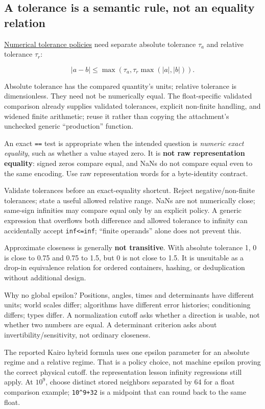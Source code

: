 \subsection{A tolerance is a semantic rule, not an equality relation}\label{01-foundations-i-ch001-a-tolerance-is-a-semantic-rule-not-an-equality-relation}

\hyperref[appendix-0ec599f8ba27]{Numerical tolerance policies} need separate absolute tolerance \(\tau_a\) and relative tolerance \(\tau_r\):

\[
|a-b|\le\max\!\left(\tau_a,\tau_r\max(|a|,|b|)\right).
\]

Absolute tolerance has the compared quantity's units; relative tolerance is dimensionless. They need not be numerically equal. The float-specific validated comparison already supplies validated tolerances, explicit non-finite handling, and widened finite arithmetic; reuse it rather than copying the attachment's unchecked generic ``production'' function.

An exact \texttt{==} test is appropriate when the intended question is \emph{numeric exact equality}, such as whether a value stayed zero. It is \textbf{not raw representation equality}: signed zeros compare equal, and NaNs do not compare equal even to the same encoding. Use raw representation words for a byte-identity contract.

Validate tolerances before an exact-equality shortcut. Reject negative/non-finite tolerances; state a useful allowed relative range. NaNs are not numerically close; same-sign infinities may compare equal only by an explicit policy. A generic expression that overflows both difference and allowed tolerance to infinity can accidentally accept \texttt{inf\textless{}=inf}; ``finite operands'' alone does not prevent this.

Approximate closeness is generally \textbf{not transitive}. With absolute tolerance 1, 0 is close to 0.75 and 0.75 to 1.5, but 0 is not close to 1.5. It is unsuitable as a drop-in equivalence relation for ordered containers, hashing, or deduplication without additional design.

Why no global epsilon? Positions, angles, times and determinants have different units; world scales differ; algorithms have different error histories; conditioning differs; types differ. A normalization cutoff asks whether a direction is usable, not whether two numbers are equal. A determinant criterion asks about invertibility/sensitivity, not ordinary closeness.

The reported Kairo hybrid formula uses one epsilon parameter for an absolute regime and a relative regime. That is a policy choice, not machine epsilon proving the correct physical cutoff. the representation lesson infinity regressions still apply. At \(10^9\), choose distinct stored neighbors separated by 64 for a float comparison example; \texttt{10\^{}9+32} is a midpoint that can round back to the same float.

